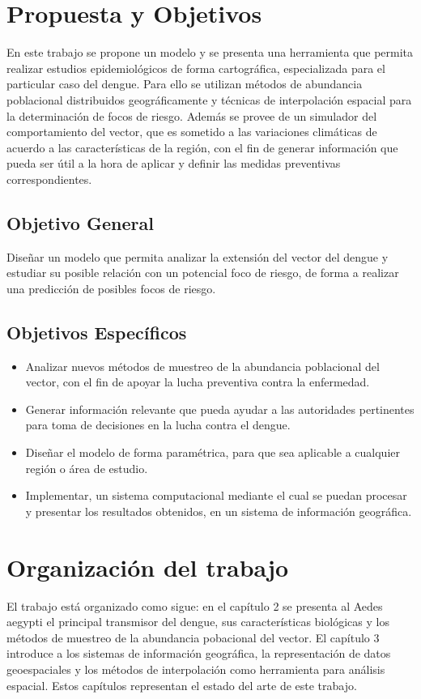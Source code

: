 \section{Propuesta y Objetivos}
En este trabajo se propone un modelo y se presenta una herramienta que permita realizar estudios
epidemiológicos de forma cartográfica, especializada para el particular caso del dengue. Para ello
se utilizan métodos de abundancia poblacional distribuidos geográficamente y técnicas de
interpolación espacial para la determinación de focos de riesgo. Además se provee de un simulador
del comportamiento del vector, que es sometido a las variaciones climáticas de acuerdo a las
características de la región, con el fin de generar información que pueda ser útil a la hora de
aplicar y definir las medidas preventivas correspondientes.

\subsection{Objetivo General}
Diseñar un modelo que permita analizar la extensión del vector del dengue y estudiar su posible
relación con un potencial foco de riesgo, de forma a realizar una predicción de posibles focos de
riesgo.

\subsection{Objetivos Específicos}

\begin{itemize}

\item Analizar nuevos métodos de muestreo de la abundancia poblacional del vector, con el fin de apoyar la lucha preventiva contra la enfermedad.

\item Generar información relevante que pueda ayudar a las autoridades pertinentes para toma de decisiones en la lucha contra el dengue.

\item Diseñar el modelo de forma paramétrica, para que sea aplicable a cualquier región o área de estudio.

\item Implementar, un sistema computacional mediante el cual se puedan procesar y presentar los resultados obtenidos, en un sistema de información geográfica.

\end{itemize}

\section{Organización del trabajo}
El trabajo está organizado como sigue: en el capítulo 2 se presenta al Aedes aegypti el principal
transmisor del dengue, sus características biológicas y los métodos de muestreo de la abundancia
pobacional del vector. El capítulo 3 introduce a los sistemas de información geográfica, la
representación de datos geoespaciales y los métodos de interpolación como herramienta para
análisis espacial. Estos capítulos representan el estado del arte de este trabajo.

